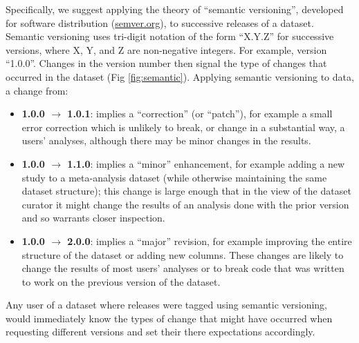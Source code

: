 \documentclass[a4paper,num-refs]{assets/oup-contemporary}
\begin{document}
Specifically, we suggest applying the theory of ``semantic versioning'', developed for software distribution (\href{http://semver.org/}{semver.org}), to successive releases of a dataset. Semantic versioning uses tri-digit notation of the form ``X.Y.Z'' for successive versions, where X, Y, and Z are non-negative integers. For example, version ``1.0.0''. Changes in the version number then signal the type of changes that occurred in the dataset (Fig \ref{fig:semantic}). Applying semantic versioning to data, a change from:
\begin{itemize}
  \item {\bf 1.0.0 $\rightarrow$ 1.0.1}: implies a ``correction'' (or ``patch''), for example a small error correction which is unlikely to break, or change in a substantial way, a users' analyses, although there may be minor changes in the results.
  \item {\bf 1.0.0 $\rightarrow$ 1.1.0}: implies a ``minor'' enhancement, for example adding a new study to a meta-analysis dataset (while otherwise maintaining the same dataset structure); this change is large enough that in the view of the dataset curator it might change the results of an analysis done with the prior version and so warrants closer inspection.
  \item {\bf 1.0.0 $\rightarrow$ 2.0.0}: implies a ``major'' revision, for example improving the entire structure of the dataset or adding new columns. These changes are likely to change the results of most users' analyses or to break code that was written to work on the previous version of the dataset.
\end{itemize}
Any user of a dataset where releases were tagged using semantic versioning, would immediately know the types of change that might have occurred when requesting different versions and set their there expectations accordingly.
\end{document}
